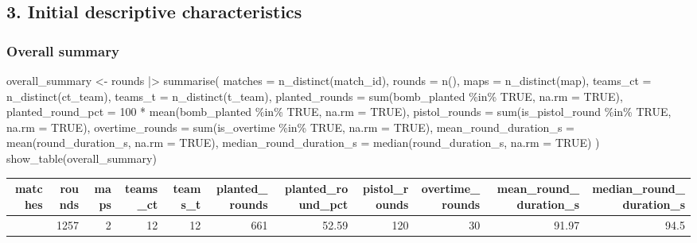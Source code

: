 \documentclass[
  letterpaper,
  DIV=11,
  numbers=noendperiod]{scrartcl}
\newenvironment{Shaded}{\begin{snugshade}}{\end{snugshade}}
\newcommand{\AttributeTok}[1]{\textcolor[rgb]{0.40,0.45,0.13}{#1}}
\newcommand{\ConstantTok}[1]{\textcolor[rgb]{0.56,0.35,0.01}{#1}}
\newcommand{\DecValTok}[1]{\textcolor[rgb]{0.68,0.00,0.00}{#1}}
\newcommand{\FunctionTok}[1]{\textcolor[rgb]{0.28,0.35,0.67}{#1}}
\newcommand{\NormalTok}[1]{\textcolor[rgb]{0.00,0.23,0.31}{#1}}
\newcommand{\OtherTok}[1]{\textcolor[rgb]{0.00,0.23,0.31}{#1}}
\newcommand{\SpecialCharTok}[1]{\textcolor[rgb]{0.37,0.37,0.37}{#1}}
\newcounter{none} %
\begin{document}
\subsection{3. Initial descriptive
characteristics}\label{initial-descriptive-characteristics}

\subsubsection{Overall summary}\label{overall-summary}

\begin{Shaded}
\begin{Highlighting}[]
\NormalTok{overall\_summary }\OtherTok{\textless{}{-}}\NormalTok{ rounds }\SpecialCharTok{|\textgreater{}}
  \FunctionTok{summarise}\NormalTok{(}
    \AttributeTok{matches =} \FunctionTok{n\_distinct}\NormalTok{(match\_id),}
    \AttributeTok{rounds =} \FunctionTok{n}\NormalTok{(),}
    \AttributeTok{maps =} \FunctionTok{n\_distinct}\NormalTok{(map),}
    \AttributeTok{teams\_ct =} \FunctionTok{n\_distinct}\NormalTok{(ct\_team),}
    \AttributeTok{teams\_t =} \FunctionTok{n\_distinct}\NormalTok{(t\_team),}
    \AttributeTok{planted\_rounds =} \FunctionTok{sum}\NormalTok{(bomb\_planted }\SpecialCharTok{\%in\%} \ConstantTok{TRUE}\NormalTok{, }\AttributeTok{na.rm =} \ConstantTok{TRUE}\NormalTok{),}
    \AttributeTok{planted\_round\_pct =} \DecValTok{100} \SpecialCharTok{*} \FunctionTok{mean}\NormalTok{(bomb\_planted }\SpecialCharTok{\%in\%} \ConstantTok{TRUE}\NormalTok{, }\AttributeTok{na.rm =} \ConstantTok{TRUE}\NormalTok{),}
    \AttributeTok{pistol\_rounds =} \FunctionTok{sum}\NormalTok{(is\_pistol\_round }\SpecialCharTok{\%in\%} \ConstantTok{TRUE}\NormalTok{, }\AttributeTok{na.rm =} \ConstantTok{TRUE}\NormalTok{),}
    \AttributeTok{overtime\_rounds =} \FunctionTok{sum}\NormalTok{(is\_overtime }\SpecialCharTok{\%in\%} \ConstantTok{TRUE}\NormalTok{, }\AttributeTok{na.rm =} \ConstantTok{TRUE}\NormalTok{),}
    \AttributeTok{mean\_round\_duration\_s =} \FunctionTok{mean}\NormalTok{(round\_duration\_s, }\AttributeTok{na.rm =} \ConstantTok{TRUE}\NormalTok{),}
    \AttributeTok{median\_round\_duration\_s =} \FunctionTok{median}\NormalTok{(round\_duration\_s, }\AttributeTok{na.rm =} \ConstantTok{TRUE}\NormalTok{)}
\NormalTok{  )}
\FunctionTok{show\_table}\NormalTok{(overall\_summary)}
\end{Highlighting}
\end{Shaded}

{\def\LTcaptype{none} %
\begin{longtable}[]{@{}rrrrrrrrrrr@{}}
\toprule\noalign{}
matches & rounds & maps & teams\_ct & teams\_t & planted\_rounds &
planted\_round\_pct & pistol\_rounds & overtime\_rounds &
mean\_round\_duration\_s & median\_round\_duration\_s \\
\midrule\noalign{}
\endhead
\bottomrule\noalign{}
\endlastfoot
60 & 1257 & 2 & 12 & 12 & 661 & 52.59 & 120 & 30 & 91.97 & 94.5 \\
\end{longtable}
}
\end{document}
